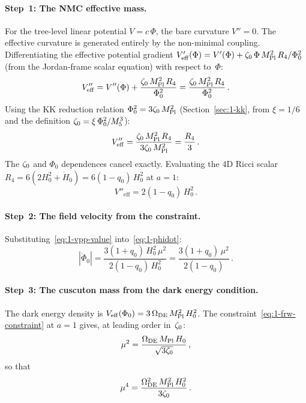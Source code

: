 \paragraph{Step~1: The NMC effective mass.} For the tree-level linear potential $V = c\,\Phi$, the bare curvature $V'' = 0$. The effective curvature is generated entirely by the non-minimal coupling. Differentiating the effective potential gradient $V'_{\mathrm{eff}}(\Phi) = V'(\Phi) + \zeta_0\, \Phi\, M_{\mathrm{Pl}}^2\, R_4/\Phi_0^2$ (from the Jordan-frame scalar equation) with respect to~$\Phi$:
\begin{equation}
\label{eq:1-vpp-eff}
V''_{\mathrm{eff}} = V''(\Phi) + \frac{\zeta_0\,M_{\mathrm{Pl}}^2\, R_4}{\Phi_0^2} = \frac{\zeta_0\,M_{\mathrm{Pl}}^2\, R_4}{\Phi_0^2}\,.
\end{equation}
Using the KK reduction relation $\Phi_0^2 = 3\zeta_0\,M_{\mathrm{Pl}}^2$ (Section~\ref{sec:1-kk}, from $\xi = 1/6$ and the definition $\zeta_0 = \xi\,\Phi_0^2/M_5^3$):
\begin{equation}
\label{eq:1-vpp-simplified}
V''_{\mathrm{eff}} = \frac{\zeta_0\,M_{\mathrm{Pl}}^2\, R_4}{3\zeta_0\,M_{\mathrm{Pl}}^2} = \frac{R_4}{3}\,.
\end{equation}
The $\zeta_0$ and $\Phi_0$ dependences cancel exactly. Evaluating the 4D Ricci scalar $R_4 = 6(2H_0^2 + \dot{H}_0) = 6(1 - q_0)\, H_0^2$ at $a = 1$:
\begin{equation}
\label{eq:1-vpp-value}
V''_{\mathrm{eff}} = 2(1 - q_0)\, H_0^2\,.
\end{equation}

\paragraph{Step~2: The field velocity from the constraint.} Substituting~\eqref{eq:1-vpp-value} into~\eqref{eq:1-phidot}:
\begin{equation}
\label{eq:1-phidot-value}
|\dot\Phi_0| = \frac{3(1+q_0)\, H_0^2\, \mu^2}{2(1 - q_0)\, H_0^2} = \frac{3(1+q_0)\,\mu^2}{2(1 - q_0)}\,.
\end{equation}

\paragraph{Step~3: The cuscuton mass from the dark energy condition.} The dark energy density is $V_{\mathrm{eff}}(\Phi_0) = 3\,\Omega_{\mathrm{DE}}\, M_{\mathrm{Pl}}^2\, H_0^2$. The constraint~\eqref{eq:1-frw-constraint} at $a = 1$ gives, at leading order in~$\zeta_0$:
\begin{equation}
\label{eq:1-mu-de}
\mu^2 = \frac{\Omega_{\mathrm{DE}}\, M_{\mathrm{Pl}}\, H_0}{\sqrt{3\zeta_0}}\,,
\end{equation}
so that
\begin{equation}
\label{eq:1-mu4}
\mu^4 = \frac{\Omega_{\mathrm{DE}}^2\, M_{\mathrm{Pl}}^2\, H_0^2}{3\zeta_0}\,.
\end{equation}

